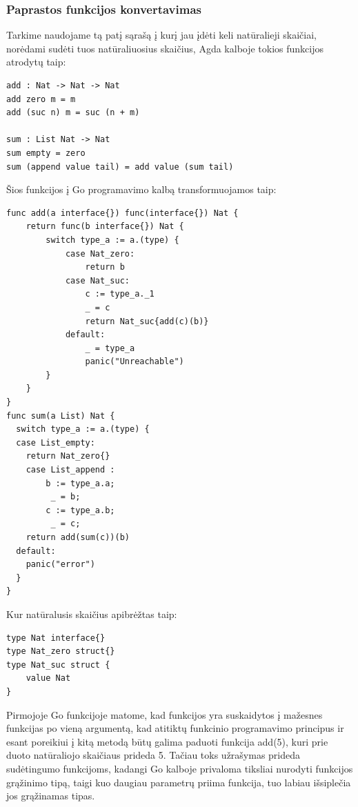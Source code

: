 \documentclass{VUMIFPSbakalaurinis}
\begin{document}
\subsubsection{Paprastos funkcijos konvertavimas}
Tarkime naudojame tą patį sąrašą į kurį jau įdėti keli natūralieji skaičiai, norėdami sudėti tuos natūraliuosius skaičius, Agda kalboje tokios funkcijos atrodytų taip:
\begin{lstlisting}
add : Nat -> Nat -> Nat
add zero m = m
add (suc n) m = suc (n + m)

sum : List Nat -> Nat
sum empty = zero
sum (append value tail) = add value (sum tail)
\end{lstlisting}
Šios funkcijos į Go programavimo kalbą transformuojamos taip:
\begin{lstlisting}[language=GoCust]
func add(a interface{}) func(interface{}) Nat {
	return func(b interface{}) Nat {
		switch type_a := a.(type) {
			case Nat_zero:
				return b
			case Nat_suc:
				c := type_a._1
				_ = c
				return Nat_suc{add(c)(b)}
			default:
				_ = type_a
				panic("Unreachable")
		}
	}
}
func sum(a List) Nat {
  switch type_a := a.(type) {
  case List_empty:
    return Nat_zero{}
	case List_append : 
		b := type_a.a;
		 _ = b;
		c := type_a.b;
		 _ = c;
    return add(sum(c))(b)
  default:
    panic("error")
  }
}
	\end{lstlisting}
	Kur natūralusis skaičius apibrėžtas taip:
	\begin{lstlisting}[language=GoCust]
type Nat interface{}
type Nat_zero struct{}
type Nat_suc struct {
	value Nat
}
\end{lstlisting}

Pirmojoje Go funkcijoje matome, kad funkcijos yra suskaidytos į mažesnes funkcijas po vieną argumentą, kad atitiktų funkcinio programavimo principus ir esant poreikiui į kitą metodą būtų galima paduoti funkcija add(5), kuri prie duoto natūraliojo skaičiaus prideda 5. Tačiau toks užrašymas prideda sudėtingumo funkcijoms, kadangi Go kalboje privaloma tiksliai nurodyti funkcijos grąžinimo tipą, taigi kuo daugiau parametrų priima funkcija, tuo labiau išsiplečia jos grąžinamas tipas.
\end{document}
